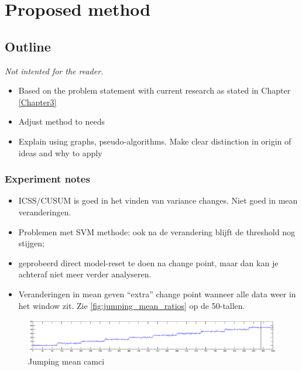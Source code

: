 
\chapter{Proposed method}

\label{Chapter4} %


\section{Outline}
\emph{Not intented for the reader.}
\begin{itemize}
  \item Based on the problem statement with current research as stated in Chapter \ref{Chapter3}
  \item Adjust method to needs
  \item Explain using graphs, pseudo-algorithms. Make clear distinction in origin of ideas and why to apply
\end{itemize}


\subsection{Experiment notes}
\begin{itemize}
  \item ICSS/CUSUM is goed in het vinden van variance changes. Niet goed in mean veranderingen.
  \item Problemen met SVM methode: ook na de verandering blijft de threshold nog stijgen;
  \item geprobeerd direct model-reset te doen na change point, maar dan kan je achteraf niet meer verder analyseren.
  \item Veranderingen in mean geven ``extra'' change point wanneer alle data weer in het window zit. Zie \ref{fig:jumping_mean_ratios} op de 50-tallen.

\end{itemize}

\begin{figure}
\centering
  \includegraphics[width=1\textwidth]{./Figures/notes/jumping_mean_camci.eps}
  \caption[Jumping mean camci]{Jumping mean camci}
\end{figure}

